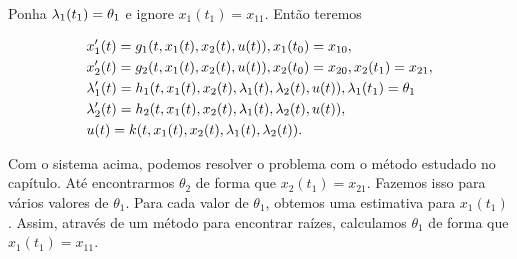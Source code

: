 Ponha $\lambda_1(t_1) = \theta_1$ e ignore $x_1(t_1) = x_{11}$. Então teremos 

\begin{align*}
    &x_1 '(t) = g_1(t, x_1(t), x_2(t), u(t)), x_1(t_0) = x_{10}, \\
    &x_2 '(t) = g_2(t, x_1(t), x_2(t), u(t)), x_2(t_0) = x_{20}, x_2(t_1) = x_{21}, \\
    &\lambda_1 '(t) = h_1(t, x_1(t), x_2(t), \lambda_1(t), \lambda_2(t), u(t)), \lambda_1(t_1) = \theta_1 \\
    &\lambda_2 '(t) = h_2(t, x_1(t), x_2(t), \lambda_1(t), \lambda_2(t), u(t)), \\
    &u(t) = k(t, x_1(t), x_2(t), \lambda_1(t), \lambda_2(t)).
\end{align*}

Com o sistema acima, podemos resolver o problema com o método estudado no
capítulo. Até encontrarmos $\theta_2$ de forma que $x_2(t_1) = x_{21}$.
Fazemos isso para vários valores de $\theta_1$. Para cada valor de $\theta_1$,
obtemos uma estimativa para $x_1(t_1)$. Assim, através de um
método para encontrar raízes, calculamos $\theta_1$ de forma que $x_1(t_1) =
x_{11}$. 